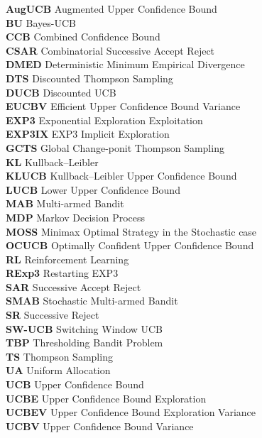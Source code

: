 \documentclass[MS,twoside]{iitmdiss}
\begin{document}
\begin{tabbing}
\textbf{AugUCB} \> Augmented Upper Confidence Bound \\
\textbf{BU} \> Bayes-UCB \\
\textbf{CCB} \> Combined Confidence Bound \\
\textbf{CSAR} \> Combinatorial Successive Accept Reject \\
\textbf{DMED} \> Deterministic Minimum Empirical Divergence \\
\textbf{DTS} \> Discounted Thompson Sampling \\
\textbf{DUCB} \> Discounted UCB \\
\textbf{EUCBV} \> Efficient Upper Confidence Bound Variance \\
\textbf{EXP3} \> Exponential Exploration Exploitation \\
\textbf{EXP3IX} \> EXP3 Implicit Exploration \\
\textbf{GCTS} \> Global Change-ponit Thompson Sampling \\
\textbf{KL} \> Kullback–Leibler \\
\textbf{KLUCB} \> Kullback–Leibler Upper Confidence Bound \\
\textbf{LUCB} \> Lower Upper Confidence Bound \\
\textbf{MAB} \> Multi-armed Bandit \\
\textbf{MDP} \> Markov Decision Process \\
\textbf{MOSS} \> Minimax Optimal Strategy in the Stochastic case \\
\textbf{OCUCB} \> Optimally Confident Upper Confidence Bound \\
\textbf{RL}   \> Reinforcement Learning \\
\textbf{RExp3}   \> Restarting EXP3 \\
\textbf{SAR} \> Successive Accept Reject \\
\textbf{SMAB} \> Stochastic Multi-armed Bandit \\
\textbf{SR} \> Successive Reject \\
\textbf{SW-UCB} \> Switching Window UCB \\ 
\textbf{TBP} \> Thresholding Bandit Problem \\
\textbf{TS} \> Thompson Sampling \\
\textbf{UA} \> Uniform Allocation \\
\textbf{UCB} \> Upper Confidence Bound \\
\textbf{UCBE} \> Upper Confidence Bound Exploration\\
\textbf{UCBEV} \> Upper Confidence Bound Exploration Variance\\
\textbf{UCBV} \> Upper Confidence Bound Variance \\



\end{tabbing}
\end{document}
